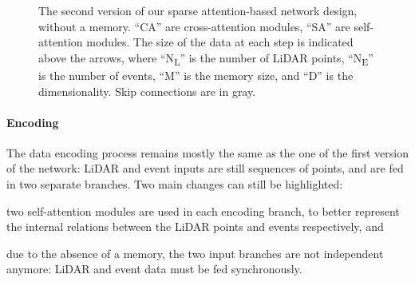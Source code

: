 \begin{figure}
{
    \shorthandon{:!}
  }

  \caption{The second version of our sparse attention-based network design, without a memory. ``CA'' are cross-attention modules, ``SA'' are self-attention modules. The size of the data at each step is indicated above the arrows, where ``N\textsubscript{L}'' is the number of LiDAR points, ``N\textsubscript{E}'' is the number of events, ``M'' is the memory size, and ``D'' is the dimensionality. Skip connections are in gray.}\label{fig:delta:sparse_network_v2}
\end{figure}

\paragraph{Encoding}
The data encoding process remains mostly the same as the one of the first version of the network: LiDAR and event inputs are still sequences of points, and are fed in two separate branches. Two main changes can still be highlighted:
\begin{enumerate*}[label=\textbf{(\arabic*)}]
  \item two self-attention modules are used in each encoding branch, to better represent the internal relations between the LiDAR points and events respectively, and
  \item due to the absence of a memory, the two input branches are not independent anymore: LiDAR and event data must be fed synchronously.
\end{enumerate*}

